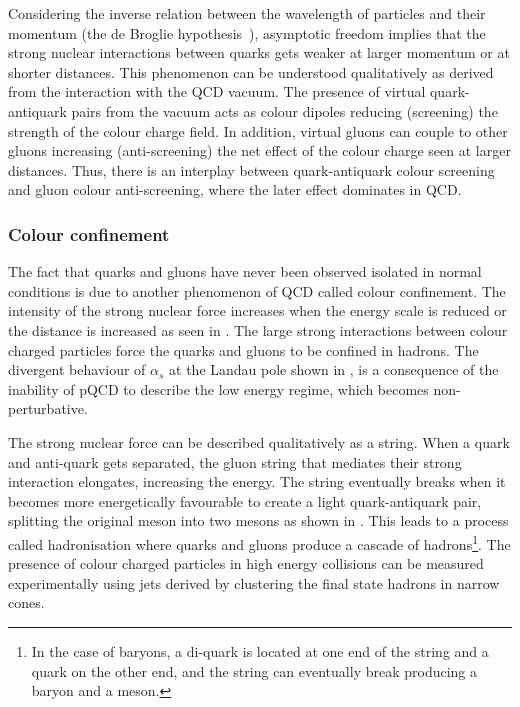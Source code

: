 Considering the inverse relation between the wavelength of particles and their momentum (the de Broglie hypothesis~\cite{Broglie}), asymptotic freedom implies that the strong nuclear interactions between quarks gets weaker at larger momentum or at shorter distances. This phenomenon can be understood qualitatively as derived from the interaction with the QCD vacuum. The presence of virtual quark-antiquark pairs from the vacuum acts as colour dipoles reducing (screening) the strength of the colour charge field. In addition, virtual gluons can couple to other gluons increasing (anti-screening) the net effect of the colour charge seen at larger distances. Thus, there is an interplay between quark-antiquark colour screening and gluon colour anti-screening, where the later effect dominates in QCD.

\subsubsection{Colour confinement}

The fact that quarks and gluons have never been observed isolated in normal conditions is due to another phenomenon of QCD called colour confinement. The intensity of the strong nuclear force increases when the energy scale is reduced or the distance is increased as seen in . The large strong interactions between colour charged particles force the quarks and gluons to be confined in hadrons. The divergent behaviour of $\alpha_{s}$ at the Landau pole shown in , is a consequence of the inability of pQCD to describe the low energy regime, which becomes non-perturbative.

The strong nuclear force can be described qualitatively as a string. When a quark and anti-quark gets separated, the gluon string that mediates their strong interaction elongates, increasing the energy. The string eventually breaks when it becomes more energetically favourable to create a light quark-antiquark pair, splitting the original meson into two mesons as shown in . This leads to a process called hadronisation where quarks and gluons produce a cascade of hadrons\footnote{In the case of baryons, a di-quark is located at one end of the string and a quark on the other end, and the string can eventually break producing a baryon and a meson.}. The presence of colour charged particles in high energy collisions can be measured experimentally using jets derived by clustering the final state hadrons in narrow cones.

